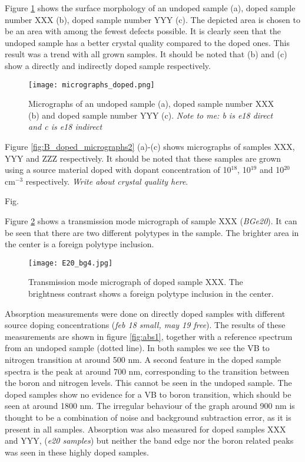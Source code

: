 Figure \ref{fig:B_doped_micrographs1} shows the surface morphology of an undoped sample (a), doped sample number XXX (b), doped sample number YYY (c). The depicted area is chosen to be an area with among the fewest defects possible. It is clearly seen that the undoped sample has a better crystal quality compared to the doped ones. This result was a trend with all grown samples. It should be noted that (b) and (c) show a directly and indirectly doped sample respectively. 

\begin{figure}[h]
\begin{center}
\texttt{[image: micrographs\_doped.png]}
\caption{Micrographs of an undoped sample (a), doped sample number XXX (b) and doped sample number YYY (c). \emph{Note to me: b is e18 direct and c is e18 indirect}
\label{fig:B_doped_micrographs1}}
\end{center}
\end{figure}

Figure \ref{fig:B_doped_micrographs2} (a)-(c) shows micrographs of samples XXX, YYY and ZZZ respectively. It should be noted that these samples are grown using a source material doped with dopant concentration of 10$^{18}$, 10$^{19}$ and 10$^{20}$ cm$^{-3}$ respectively. \emph{Write about crystal quality here}. 

Fig. 

Figure \ref{fig:BGe20_micrograph} shows a transmission mode micrograph of sample XXX (\emph{BGe20}). It can be seen that there are two different polytypes in the sample. The brighter area in the center is a foreign polytype inclusion. 

\begin{figure}[h]
\begin{center}
\texttt{[image: E20\_bg4.jpg]}
\caption{Transmission mode micrograph of doped sample XXX. The brightness contrast shows a foreign polytype inclusion in the center. 
\label{fig:BGe20_micrograph}}
\end{center}
\end{figure}

Absorption measurements were done on directly doped samples with different source doping concentrations (\emph{feb 18 small, may 19 free}). The results of these measurements are shown in figure \ref{fig:abs1}, together with a reference spectrum from an undoped sample (dotted line). In both samples we see the VB to nitrogen transition at around 500 nm. A second feature in the doped sample spectra is the peak at around 700 nm, corresponding to the transition between the boron and nitrogen levels. This cannot be seen in the undoped sample. The doped samples show no evidence for a VB to boron transition, which should be seen at around 1800 nm. The irregular behaviour of the graph around 900 nm is thought to be a combination of noise and background subtraction error, as it is present in all samples.  Absorption was also measured for doped samples XXX and YYY, (\emph{e20 samples}) but neither the band edge nor the boron related peaks was seen in these highly doped samples. 

